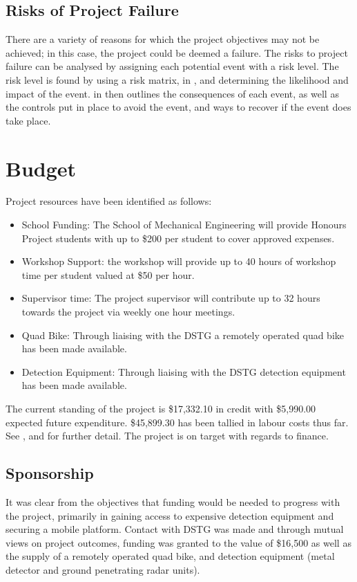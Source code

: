 \documentclass[main.tex]{subfiles}
\begin{document}
\subsection{Risks of Project Failure}
There are a variety of reasons for which the project objectives may not be achieved; in this case, the project could be deemed a failure. The risks to project failure can be analysed by assigning each potential event with a risk level. The risk level is found by using a risk matrix,  in , and determining the likelihood and impact of the event.  in  then outlines the consequences of each event, as well as the controls put in place to avoid the event, and ways to recover if the event does take place.

\section{Budget}
Project resources have been identified as follows:
\begin{itemize}
\item School Funding: The School of Mechanical Engineering will provide Honours Project students with up to \$200 per student to cover approved expenses.
\item Workshop Support: the workshop will provide up to 40 hours of workshop time per student valued at \$50 per hour.
\item Supervisor time: The project supervisor will contribute up to 32 hours towards the project via weekly one hour meetings.
\item Quad Bike: Through liaising with the DSTG a remotely operated quad bike has been made available.
\item Detection Equipment: Through liaising with the DSTG detection equipment has been made available.
\end{itemize}
The current standing of the project is \$17,332.10 in credit with \$5,990.00 expected future expenditure. \$45,899.30 has been tallied in labour costs thus far. See , and  for further detail. The project is on target with regards to finance.

\subsection{Sponsorship}
It was clear from the objectives that funding would be needed to progress with the project, primarily in gaining access to expensive detection equipment and securing a mobile platform. Contact with DSTG was made and through mutual views on project outcomes, funding was granted to the value of \$16,500 as well as the supply of a remotely operated quad bike, and detection equipment (metal detector and ground penetrating radar units).
\end{document}
